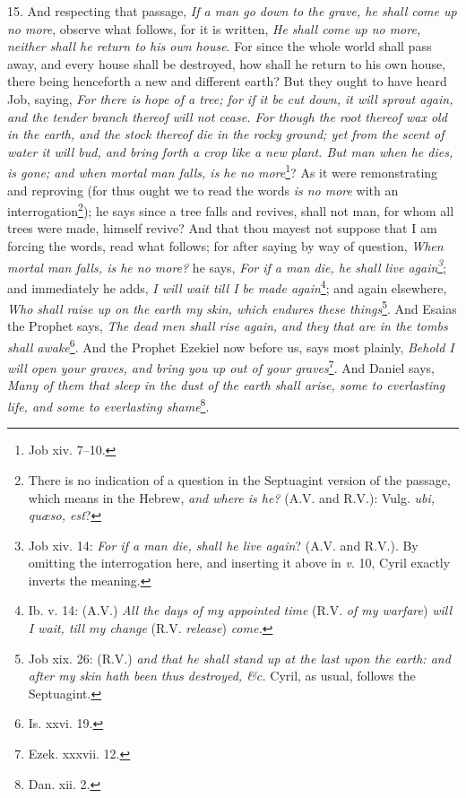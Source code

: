 15. And respecting that passage, \emph{If a man go down to the grave, he shall come up no more}, observe what follows, for it is written, \emph{He shall come up no more, neither shall he return to his own house}. For since the whole world shall pass away, and every house shall be destroyed, how shall he return to his own house, there being henceforth a new and different earth? But they ought to have heard Job, saying, \emph{For there is hope of a tree; for if it be cut down, it will sprout again, and the tender branch thereof will not cease. For though the root thereof wax old in the earth, and the stock thereof die in the rocky ground; yet from the scent of water it will bud, and bring forth a crop like a new plant. But man when he dies, is gone; and when mortal man falls, is he no more}\footnote{Job xiv. 7–10.}? As it were remonstrating and reproving (for thus ought we to read the words \emph{is no more} with an interrogation\footnote{There is no indication of a question in the Septuagint version of the passage, which means in the Hebrew, \emph{and where is he?} (\textsc{A.V.} and \textsc{R.V.}): Vulg. \emph{ubi, quæso, est}?}); he says since a tree falls and revives, shall not man, for whom all trees were made, himself revive? And that thou mayest not suppose that I am forcing the words, read what follows; for after saying by way of question, \emph{When mortal man falls, is he no more?} he says, \emph{For if a man die, he shall live again\footnote{Job xiv. 14: \emph{For if a man die, shall he live again}? (\textsc{A.V.} and \textsc{R.V.}). By omitting the interrogation here, and inserting it above in \emph{v}. 10, Cyril exactly inverts the meaning.}}; and immediately he adds, \emph{I will wait till I be made again}\footnote{Ib. v. 14: (A.V.) \emph{All the days of my appointed time} (\textsc{R.V.} \emph{of my warfare}) \emph{will I wait, till my change} (\textsc{R.V.} \emph{release}) \emph{come.}}; and again elsewhere, \emph{Who shall raise up on the earth my skin, which endures these things}\footnote{Job xix. 26: (R.V.) \emph{and that he shall stand up at the last upon the earth: and after my skin hath been thus destroyed, \&c.} Cyril, as usual, follows the Septuagint.}. And Esaias the Prophet says, \emph{The dead men shall rise again, and they that are in the tombs shall awake}\footnote{Is. xxvi. 19.}. And the Prophet Ezekiel now before us, says most plainly, \emph{Behold I will open your graves, and bring you up out of your graves}\footnote{Ezek. xxxvii. 12.}. And Daniel says, \emph{Many of them that sleep in the dust of the earth shall arise, some to everlasting life, and some to everlasting shame}\footnote{Dan. xii. 2.}.

